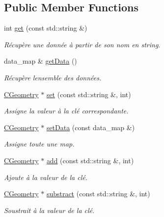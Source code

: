 \subsection*{Public Member Functions}
\begin{DoxyCompactItemize}
\item 
int \hyperlink{class_c_geometry_a1ef1162bc64762d26a69941fee616d93}{get} (const std\+::string \&)
\begin{DoxyCompactList}\small\item\em Récupère une donnée à partir de son nom en string. \end{DoxyCompactList}\item 
data\+\_\+map \& \hyperlink{class_c_geometry_a688f5db2b2a76f7b0bf6e4507769a838}{get\+Data} ()
\begin{DoxyCompactList}\small\item\em Récupère l\textquotesingle{}ensemble des données. \end{DoxyCompactList}\item 
\hyperlink{class_c_geometry}{C\+Geometry} $\ast$ \hyperlink{class_c_geometry_ac4da7f8f7cc75a51fde473f36b0e45b2}{set} (const std\+::string \&, int)
\begin{DoxyCompactList}\small\item\em Assigne la valeur à la clé correspondante. \end{DoxyCompactList}\item 
\hyperlink{class_c_geometry}{C\+Geometry} $\ast$ \hyperlink{class_c_geometry_a005ba0235bea89dc99f4168e8d601529}{set\+Data} (const data\+\_\+map \&)
\begin{DoxyCompactList}\small\item\em Assigne toute une map. \end{DoxyCompactList}\item 
\hyperlink{class_c_geometry}{C\+Geometry} $\ast$ \hyperlink{class_c_geometry_aa5b2f21b9f0f8ca71adac95deb83c988}{add} (const std\+::string \&, int)
\begin{DoxyCompactList}\small\item\em Ajoute à la valeur de la clé. \end{DoxyCompactList}\item 
\hyperlink{class_c_geometry}{C\+Geometry} $\ast$ \hyperlink{class_c_geometry_a4ecf6f7759dc70dc0dd04b9a68db8c1b}{substract} (const std\+::string \&, int)
\begin{DoxyCompactList}\small\item\em Soustrait à la valeur de la clé. \end{DoxyCompactList}\item 

\end{DoxyCompactItemize}
